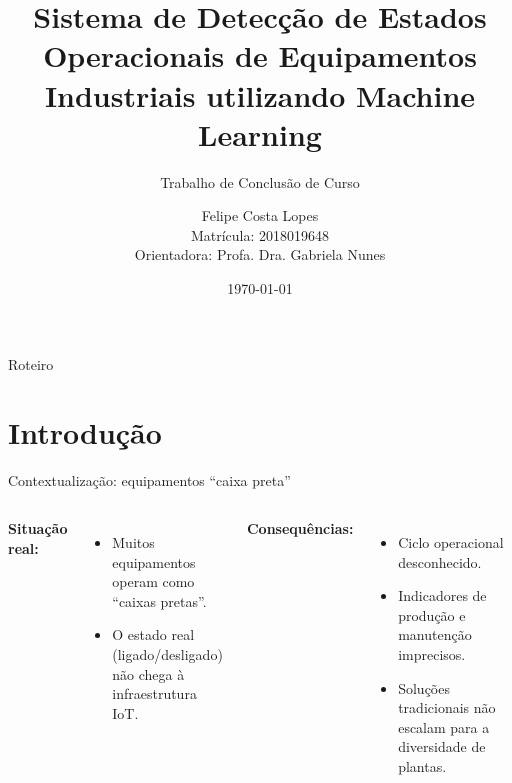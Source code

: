 \documentclass{beamer}
\title[Detecção de Estados Operacionais]{Sistema de Detecção de Estados Operacionais de Equipamentos Industriais utilizando Machine Learning}
\subtitle{Trabalho de Conclusão de Curso}
\author[Felipe C. Lopes]{Felipe Costa Lopes \\ {\footnotesize Matrícula: 2018019648} \\ {\footnotesize Orientadora: Profa. Dra. Gabriela Nunes}}
\institute[UFMG]{Universidade Federal de Minas Gerais}
\date{\today}
\begin{document}
\begin{frame}
    \titlepage
\end{frame}

\begin{frame}{Roteiro}
    \tableofcontents
\end{frame}

\section{Introdução}

\begin{frame}{Contextualização: equipamentos ``caixa preta''}
    \begin{columns}
        \textbf{Situação real:}
        \begin{itemize}
            \item Muitos equipamentos operam como ``caixas pretas''.
            \item O estado real (ligado/desligado) não chega à infraestrutura IoT.
        \end{itemize}

        \textbf{Consequências:}
        \begin{itemize}
            \item Ciclo operacional desconhecido.
            \item Indicadores de produção e manutenção imprecisos.
            \item Soluções tradicionais não escalam para a diversidade de plantas.
        \end{itemize}
    \end{columns}
\end{frame}
\end{document}
